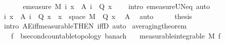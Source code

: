 \begin{isabellebody}
\ \ \isacommand{{\isacharbraceright}{\kern0pt}}\isamarkupfalse%
\isanewline
\ \ \isamarkupfalse%
\ {\isachardoublequoteopen}emeasure\ M\ {\isacharparenleft}{\kern0pt}{\isasymUnion}i{\isachardot}{\kern0pt}\ {\isacharbraceleft}{\kern0pt}x\ {\isasymin}\ A\ i{\isachardot}{\kern0pt}\ {\isasymnot}\ Q\ x{\isacharbraceright}{\kern0pt}{\isacharparenright}{\kern0pt}\ {\isacharequal}{\kern0pt}\ {}{\isachardoublequoteclose}\ \isamarkupfalse%
\ {\isacharparenleft}{\kern0pt}intro\ emeasure{\isacharunderscore}{\kern0pt}UN{\isacharunderscore}{\kern0pt}eq{\isacharunderscore}{\kern0pt}{}{\isacharcomma}{\kern0pt}\ auto{\isacharparenright}{\kern0pt}\isanewline
\ \ \isamarkupfalse%
\ \isamarkupfalse%
\ {\isachardoublequoteopen}{\isacharparenleft}{\kern0pt}{\isasymUnion}i{\isachardot}{\kern0pt}\ {\isacharbraceleft}{\kern0pt}x\ {\isasymin}\ A\ i{\isachardot}{\kern0pt}\ {\isasymnot}\ Q\ x{\isacharbraceright}{\kern0pt}{\isacharparenright}{\kern0pt}\ {\isacharequal}{\kern0pt}\ {\isacharbraceleft}{\kern0pt}x\ {\isasymin}\ space\ M{\isachardot}{\kern0pt}\ {\isasymnot}\ Q\ x{\isacharbraceright}{\kern0pt}{\isachardoublequoteclose}\ \isamarkupfalse%
\ A\ \isamarkupfalse%
\ auto\isanewline
\ \ \isamarkupfalse%
\ \isamarkupfalse%
\ {\isacharquery}{\kern0pt}thesis\ \isamarkupfalse%
\ {\isacharparenleft}{\kern0pt}intro\ AE{\isacharunderscore}{\kern0pt}iff{\isacharunderscore}{\kern0pt}measurable{\isacharbrackleft}{\kern0pt}THEN\ iffD{}{\isacharbrackright}{\kern0pt}{\isacharcomma}{\kern0pt}\ auto{\isacharparenright}{\kern0pt}\isanewline
{}\isamarkupfalse%
%
\endisatagproof
{\isafoldproof}%
%
\isadelimproof
\isanewline
%
\endisadelimproof
\isanewline
\isanewline
{}\isamarkupfalse%
\ averaging{\isacharunderscore}{\kern0pt}theorem{\isacharcolon}{\kern0pt}\isanewline
\ \ \ f{\isacharcolon}{\kern0pt}{\isacharcolon}{\kern0pt}{\isachardoublequoteopen}{\isacharunderscore}{\kern0pt}\ {\isasymRightarrow}\ {\isacharprime}{\kern0pt}b{\isacharcolon}{\kern0pt}{\isacharcolon}{\kern0pt}{\isacharbraceleft}{\kern0pt}second{\isacharunderscore}{\kern0pt}countable{\isacharunderscore}{\kern0pt}topology{\isacharcomma}{\kern0pt}\ banach{\isacharbraceright}{\kern0pt}{\isachardoublequoteclose}\isanewline
\ \ \ {\isacharbrackleft}{\kern0pt}measurable{\isacharbrackright}{\kern0pt}{\isacharcolon}{\kern0pt}{\isachardoublequoteopen}integrable\ M\ f{\isachardoublequoteclose}\ \isanewline

\end{isabellebody}
